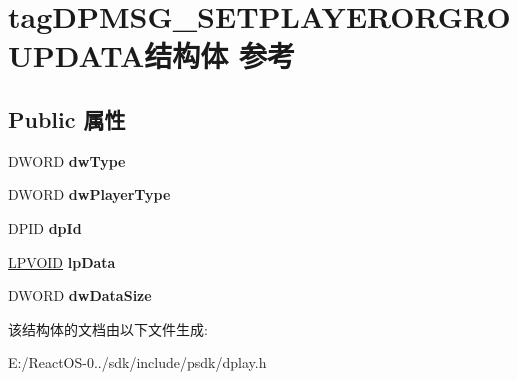 \hypertarget{structtag_d_p_m_s_g___s_e_t_p_l_a_y_e_r_o_r_g_r_o_u_p_d_a_t_a}{}\section{tag\+D\+P\+M\+S\+G\+\_\+\+S\+E\+T\+P\+L\+A\+Y\+E\+R\+O\+R\+G\+R\+O\+U\+P\+D\+A\+T\+A结构体 参考}
\label{structtag_d_p_m_s_g___s_e_t_p_l_a_y_e_r_o_r_g_r_o_u_p_d_a_t_a}
\subsection*{Public 属性}
\begin{DoxyCompactItemize}
\item 
\mbox{\label{structtag_d_p_m_s_g___s_e_t_p_l_a_y_e_r_o_r_g_r_o_u_p_d_a_t_a_aa9e45508595f22fbe24f73f7e08044dd}} 
D\+W\+O\+RD {\bfseries dw\+Type}
\item 
\mbox{\label{structtag_d_p_m_s_g___s_e_t_p_l_a_y_e_r_o_r_g_r_o_u_p_d_a_t_a_a5f12e0d85ec7b543b25adf9d689689c5}} 
D\+W\+O\+RD {\bfseries dw\+Player\+Type}
\item 
\mbox{\label{structtag_d_p_m_s_g___s_e_t_p_l_a_y_e_r_o_r_g_r_o_u_p_d_a_t_a_a219c1c4f8500e727122463ffaa517993}} 
D\+P\+ID {\bfseries dp\+Id}
\item 
\mbox{\label{structtag_d_p_m_s_g___s_e_t_p_l_a_y_e_r_o_r_g_r_o_u_p_d_a_t_a_a1695195eb11ab56479f9cad2ef2e9e8f}} 
\hyperlink{interfacevoid}{L\+P\+V\+O\+ID} {\bfseries lp\+Data}
\item 
\mbox{\label{structtag_d_p_m_s_g___s_e_t_p_l_a_y_e_r_o_r_g_r_o_u_p_d_a_t_a_acb399f620937984eaecd2ab620759b43}} 
D\+W\+O\+RD {\bfseries dw\+Data\+Size}
\end{DoxyCompactItemize}


该结构体的文档由以下文件生成\+:\begin{DoxyCompactItemize}
\item 
E\+:/\+React\+O\+S-\/0../sdk/include/psdk/dplay.\+h\end{DoxyCompactItemize}
